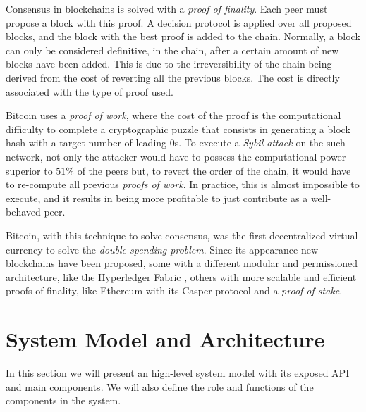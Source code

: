 \documentclass[10pt,journal,compsoc]{IEEEtran}
\begin{document}
	Consensus in blockchains is solved with a \textit{proof of finality}. Each peer must propose a block with this proof. A decision protocol is applied over all proposed blocks, and the block with the best proof is added to the chain. Normally, a block can only be considered definitive, in the chain, after a certain amount of new blocks have been added. This is due to the irreversibility of the chain being derived from the cost of reverting all the previous blocks. The cost is directly associated with the type of proof used.

	Bitcoin\cite{nakamoto2019bitcoin} uses a \textit{proof of work}, where the cost of the proof is the computational difficulty to complete a cryptographic puzzle that consists in generating a block hash with a target number of leading 0s. To execute a \textit{Sybil attack} on the such network, not only the attacker would have to possess the computational power superior to $51\%$ of the peers but, to revert the order of the chain, it would have to re-compute all previous \textit{proofs of work}. In practice, this is almost impossible to execute, and it results in being more profitable to just contribute as a well-behaved peer.

	Bitcoin, with this technique to solve consensus, was the first decentralized virtual currency to solve the \textit{double spending problem}. Since its appearance new blockchains have been proposed, some with a different modular and permissioned architecture, like the Hyperledger Fabric \cite{androulaki2018hyperledger}\cite{sousa2018byzantineHyperledger}, others with more scalable and efficient proofs of finality\cite{croman2016scaling}, like Ethereum with its Casper protocol\cite{CasperTheFriendlyFinalityGadget}\cite{CasperMadeSimple} and a \textit{proof of stake}.

	
	\section{System Model and Architecture}
	
	In this section we will present an high-level system model with its exposed API and main components. We will also define the role and functions of the components in the system.
	
\end{document}
